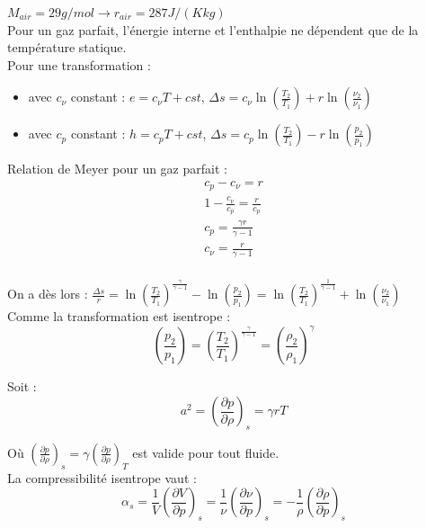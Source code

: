 \documentclass[../main.tex]{subfiles}
\begin{document}
$M_{air} = 29g/mol \rightarrow r_{air} = 287 J/(K kg)$\\

Pour un gaz parfait, l'énergie interne et l'enthalpie ne dépendent que de la température statique.\\

Pour une transformation : \begin{itemize}
    \item avec $c_\nu$ constant : $e = c_\nu T+cst$, $\Delta s = c_\nu \ln(\frac{T_2}{T_1})+r\ln(\frac{\nu_2}{\nu_1})$\\
    \item avec $c_p$ constant : $h = c_p T+cst$, $\Delta s = c_p \ln(\frac{T_2}{T_1})-r\ln(\frac{p_2}{p_1})$\\
\end{itemize}

Relation de Meyer pour un gaz parfait : \begin{equation}
    \begin{gathered}
        c_p-c_\nu = r\\
        1-\frac{c_\nu}{c_p} = \frac{r}{c_p}\\
        c_p = \frac{\gamma r}{\gamma-1}\\
        c_\nu = \frac{r}{\gamma-1}\\
    \end{gathered}
\end{equation}

On a dès lors : $\frac{\Delta s}{r} = \ln(\frac{T_2}{T_1})^\frac{\gamma}{\gamma-1}-\ln(\frac{p_2}{p_1}) = \ln(\frac{T_2}{T_1})^\frac{1}{\gamma-1}+ \ln(\frac{\nu_2}{\nu_1})$\\
Comme la transformation est isentrope : \\
\begin{equation}
    (\frac{p_2}{p_1}) = (\frac{T_2}{T_1})^\frac{\gamma}{\gamma-1} = (\frac{\rho_2}{\rho_1})^\gamma
\end{equation}

Soit :\\
\begin{equation}
    a^2 = (\frac{\partial p}{\partial \rho})_s = \gamma r T
\end{equation}

\warning Où $(\frac{\partial p}{\partial \rho})_s = \gamma (\frac{\partial p}{\partial \rho})_T$ est valide pour tout fluide.\\



La compressibilité isentrope vaut : \begin{equation}
    \alpha_s = \frac{1}{V} (\frac{\partial V}{\partial p})_s = \frac{1}{\nu} (\frac{\partial \nu}{\partial p})_s = -\frac{1}{\rho} (\frac{\partial \rho}{\partial p})_s
\end{equation}
\end{document}
